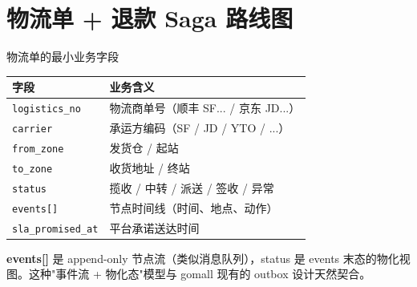 \section{物流单 + 退款 Saga 路线图}

\begin{frame}{物流单的最小业务字段}
\begin{tabular}{@{}ll@{}}
\toprule
字段 & 业务含义 \\
\midrule
\texttt{logistics\_no}      & 物流商单号（顺丰 SF... / 京东 JD...） \\
\texttt{carrier}            & 承运方编码（SF / JD / YTO / ...） \\
\texttt{from\_zone}         & 发货仓 / 起站 \\
\texttt{to\_zone}           & 收货地址 / 终站 \\
\texttt{status}             & 揽收 / 中转 / 派送 / 签收 / 异常 \\
\texttt{events[]}           & 节点时间线（时间、地点、动作） \\
\texttt{sla\_promised\_at}  & 平台承诺送达时间 \\
\bottomrule
\end{tabular}
\vspace{2mm}
\small \textbf{events[]} 是 append-only 节点流（类似消息队列），status 是 events 末态的物化视图。这种"事件流 + 物化态"模型与 gomall 现有的 outbox 设计天然契合。
\end{frame}

